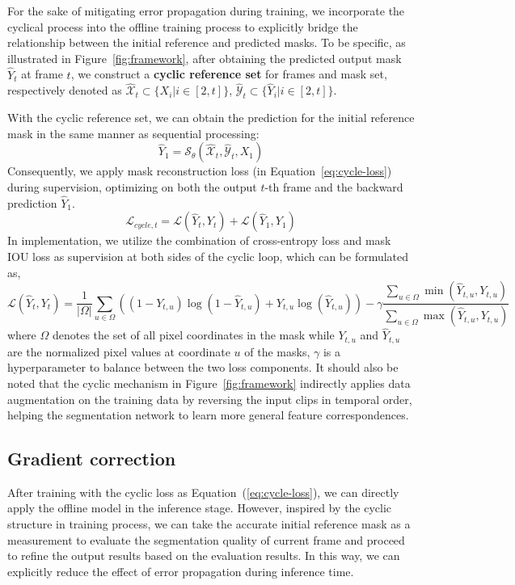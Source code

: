 \documentclass{article}
\begin{document}
For the sake of mitigating error propagation during training, we incorporate the cyclical process into the offline training process to explicitly bridge the relationship between the initial reference and predicted masks. To be specific, as illustrated in Figure~\ref{fig:framework}, after obtaining the predicted output mask $\widehat{Y}_t$ at frame $t$, we construct a \textbf{cyclic reference set} for frames and mask set, respectively denoted as $\widehat{\mathcal{X}}_t \subset \{X_i | i \in [2, t]\}$, $\widehat{\mathcal{Y}}_t \subset \{\widehat{Y}_i | i \in [2, t]\}$.

With the cyclic reference set, we can obtain the prediction for the initial reference mask in the same manner as sequential processing:
\begin{equation}\label{eq:cycle}
    \widehat{Y}_1 = \mathcal{S}_{\theta}\left(\widehat{\mathcal{X}}_{t}, \widehat{\mathcal{Y}}_{t}, X_1 \right)
\end{equation}
Consequently, we apply mask reconstruction loss (in Equation~\ref{eq:cycle-loss}) during supervision, optimizing on both the output $t$-th frame and the backward prediction $\widehat{Y}_1$.
\begin{equation}\label{eq:cycle-loss}
    \mathcal{L}_{cycle, t} = \mathcal{L}(\widehat{Y}_t, Y_t) + \mathcal{L}(\widehat{Y}_1, Y_1)
\end{equation}
In implementation, we utilize the combination of cross-entropy loss and mask IOU loss as supervision at both sides of the cyclic loop, which can be formulated as,
\begin{equation}\label{eq:loss}
    \mathcal{L}(\widehat{Y}_t, Y_t) = \frac{1}{|\Omega|}\sum_{u \in \Omega}{\left(\left(1-Y_{t,u}\right)\log(1-\widehat{Y}_{t,u}) + Y_{t,u}\log(\widehat{Y}_{t,u}) \right)} - \gamma\frac{\sum_{u\in \Omega}{\min(\widehat{Y}_{t,u}, Y_{t,u})}}{\sum_{u\in \Omega}{\max(\widehat{Y}_{t,u}, Y_{t,u})}}
\end{equation}
where $\Omega$ denotes the set of all pixel coordinates in the mask while $Y_{t,u}$ and $\widehat{Y}_{t,u}$ are the normalized pixel values at coordinate $u$ of the masks, $\gamma$ is a hyperparameter to balance between the two loss components. It should also be noted that the cyclic mechanism in Figure~\ref{fig:framework} indirectly applies data augmentation on the training data by reversing the input clips in temporal order, helping the segmentation network to learn more general feature correspondences.

\subsection{Gradient correction}
After training with the cyclic loss as Equation~(\ref{eq:cycle-loss}), we can directly apply the offline model in the inference stage. However, inspired by the cyclic structure in training process, we can take the accurate initial reference mask as a measurement to evaluate the segmentation quality of current frame and proceed to refine the output results based on the evaluation results. In this way, we can explicitly reduce the effect of error propagation during inference time.
\end{document}
